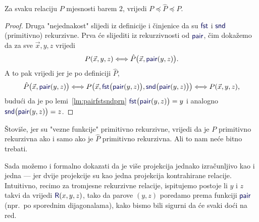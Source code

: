 \begin{lema}[{name=[međusobna svedivost relacije i njene kontrakcije]}]\label{lm:hatPeqP}
Za svaku relaciju $P$ mjesnosti barem $2$, vrijedi $P\preceq\hat P\preceq P$.
\end{lema}
\begin{proof}
Druga "nejednakost" slijedi iz definicije i činjenice da su $\f{fst}$ i $\f{snd}$ (primitivno) rekurzivne. Prva će slijediti iz rekurzivnosti od $\f{pair}$, čim dokažemo da za sve $\vec x,y,z$ vrijedi
\begin{equation}\label{eq:hatPpair}
    P(\vec x,y,z)\Longleftrightarrow\hat P\bigl(\vec x,\f{pair}(y,z)\bigr)\text.
\end{equation}
A to pak vrijedi jer je po definiciji $\hat P$,
\begin{equation}
    \hat P\bigl(\vec x,\f{pair}(y,z)\bigr)\Longleftrightarrow P\bigl(\vec x,\f{fst}\bigl(\f{pair}(y,z)\bigr),\f{snd}\bigl(\f{pair}(y,z)\bigr)\bigr)\Longleftrightarrow P(\vec x,y,z)\text,
\end{equation}
budući da je po lemi~\ref{lm:pairfstsndprn} $\f{fst}\bigl(\f{pair}(y,z)\bigr)=y$ i analogno $\f{snd}\bigl(\f{pair}(y,z)\bigr)=z$.
\end{proof}

\begin{napomena}[{name=[kontrahiranje čuva i primitivnu rekurzivnost]}]\label{nap:kontrprn}
Štoviše, jer su "vezne funkcije" primitivno rekurzivne, vrijedi da je $P$ primitivno rekurzivna ako i samo ako je $\hat P$ primitivno rekurzivna. Ali to nam neće bitno trebati.
\end{napomena}


Sada možemo i formalno dokazati da je više projekcija jednako izračunljivo kao i jedna --- jer dvije projekcije su kao jedna projekcija kontrahirane relacije. Intuitivno, recimo za tromjesne rekurzivne relacije, ispitujemo postoje li $y$ i $z$ takvi da vrijedi $\f R(x,y,z)$, tako da parove $(y,z)$ poredamo prema funkciji $\f{pair}$ (npr.\ po sporednim dijagonalama), kako bismo bili sigurni da će svaki doći na red.

